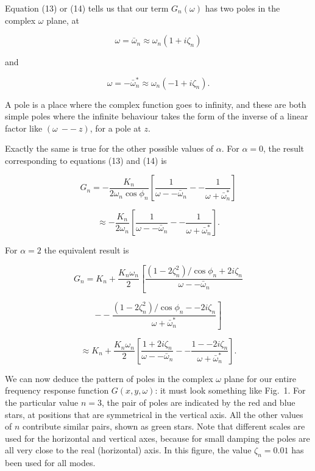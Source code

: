   Equation (13) or (14) tells us that our term $G_n(\omega)$ has two poles in 
  the complex $\omega$ plane, at 

  $$\omega = \bar{\omega}_n \approx \omega_n(1 + i \zeta_n) \tag{15}$$ 

  and 

  $$\omega = -\bar{\omega}_n^* \approx \omega_n(-1 + i \zeta_n) . \tag{16}$$ 

  A pole is a place where the complex function goes to infinity, and these are 
  both simple poles where the infinite behaviour takes the form of the inverse 
  of a linear factor like $(\omega \mathrm{~} -- \mathrm{~} z)$, for a pole at 
  $z$. 

  Exactly the same is true for the other possible values of $\alpha$. For 
  $\alpha = 0$, the result corresponding to equations (13) and (14) is 

  $$G_n = -\dfrac{K_n}{2 \omega_n \cos \phi_n} \left[\dfrac{1}{\omega -- 
  \bar{\omega}_n} -- \dfrac{1}{\omega + \bar{\omega}^*_n} \right] \tag{17}$$ 

  $$\approx -\dfrac{K_n}{2 \omega_n } \left[\dfrac{1}{\omega -- \bar{\omega}_n} 
  -- \dfrac{1}{\omega + \bar{\omega}^*_n} \right] . \tag{18}$$ 

  For $\alpha = 2$ the equivalent result is 

  $$G_n = K_n+\dfrac{K_n \omega_n}{2} \left[\dfrac{(1-2\zeta_n^2)/\cos \phi_n + 
  2 i \zeta_n}{\omega -- \bar{\omega}_n}\right.$$ 

  $$\left. -- \dfrac{(1-2\zeta_n^2)/\cos \phi_n -- 2 i \zeta_n}{\omega + 
  \bar{\omega}^*_n} \right] \tag{19}$$ 

  $$\approx K_n+\dfrac{K_n \omega_n}{2} \left[\dfrac{1 + 2 i \zeta_n}{\omega -- 
  \bar{\omega}_n} -- \dfrac{1 -- 2 i \zeta_n}{\omega + \bar{\omega}^*_n} 
  \right] . \tag{20}$$ 

  We can now deduce the pattern of poles in the complex $\omega$ plane for our 
  entire frequency response function $G(x,y,\omega)$: it must look something 
  like Fig.\ 1. For the particular value $n=3$, the pair of poles are indicated 
  by the red and blue stars, at positions that are symmetrical in the vertical 
  axis. All the other values of $n$ contribute similar pairs, shown as green 
  stars. Note that different scales are used for the horizontal and vertical 
  axes, because for small damping the poles are all very close to the real 
  (horizontal) axis. In this figure, the value $\zeta_n = 0.01$ has been used 
  for all modes. 

